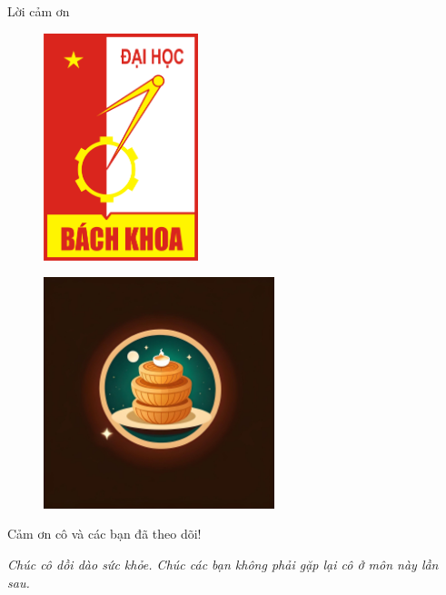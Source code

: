 \documentclass[presentation]{beamer}
\begin{document}
\begin{frame}{Lời cảm ơn}
	\begin{minipage}{0.45\textwidth}
		\begin{figure}[H]
		\centering
		\includegraphics[width=0.4\textwidth]{logo_hust}
		\end{figure}
	\end{minipage}\hfill
	\begin{minipage}{0.45\textwidth}
		\begin{figure}[H]
		\centering
		\includegraphics[width=0.6\textwidth]{logo_nhom}
		\end{figure}
	\end{minipage}
	\begin{center}
		\LARGE Cảm ơn cô và các bạn đã theo dõi!
	\end{center}
	\begin{block}
		\Large \textit{Chúc cô dồi dào sức khỏe. Chúc các bạn không phải gặp lại cô ở môn này lần sau.}
	\end{block}
\end{frame}
\end{document}
